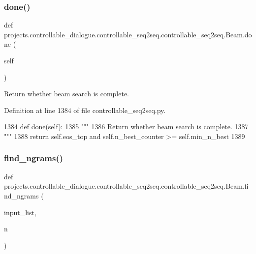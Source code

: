 \subsubsection{\texorpdfstring{done()}{done()}}
{\footnotesize\ttfamily def projects.\+controllable\+\_\+dialogue.\+controllable\+\_\+seq2seq.\+controllable\+\_\+seq2seq.\+Beam.\+done (\begin{DoxyParamCaption}\item[{}]{self }\end{DoxyParamCaption})}

\begin{DoxyVerb}Return whether beam search is complete.
\end{DoxyVerb}
 

Definition at line 1384 of file controllable\+\_\+seq2seq.\+py.


\begin{DoxyCode}
1384     \textcolor{keyword}{def }done(self):
1385         \textcolor{stringliteral}{"""}
1386 \textcolor{stringliteral}{        Return whether beam search is complete.}
1387 \textcolor{stringliteral}{        """}
1388         \textcolor{keywordflow}{return} self.eos\_top \textcolor{keywordflow}{and} self.n\_best\_counter >= self.min\_n\_best
1389 
\end{DoxyCode}
\mbox{\label{classprojects_1_1controllable__dialogue_1_1controllable__seq2seq_1_1controllable__seq2seq_1_1Beam_af5324f7145d2e11bbfcb44bbeda5dbec}} 
\subsubsection{\texorpdfstring{find\+\_\+ngrams()}{find\_ngrams()}}
{\footnotesize\ttfamily def projects.\+controllable\+\_\+dialogue.\+controllable\+\_\+seq2seq.\+controllable\+\_\+seq2seq.\+Beam.\+find\+\_\+ngrams (\begin{DoxyParamCaption}\item[{}]{input\+\_\+list,  }\item[{}]{n }\end{DoxyParamCaption})\hspace{0.3cm}{\ttfamily [static]}}

